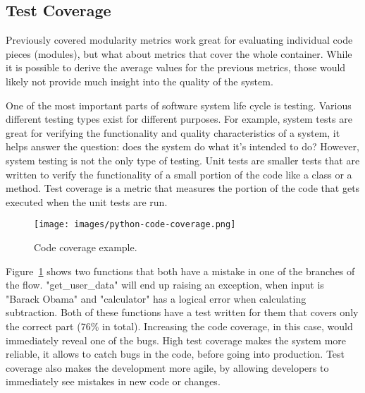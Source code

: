 \documentclass[12pt]{article}
\begin{document}
\subsection{Test Coverage}
Previously covered modularity metrics work great for evaluating individual code pieces (modules), but what about metrics that cover the whole container. While it is possible to derive the average values for the previous metrics, those would likely not provide much insight into the quality of the system. \par
One of the most important parts of software system life cycle is testing. Various different testing types exist for different purposes. For example, system tests are great for verifying the functionality and quality characteristics of a system, it helps answer the question: does the system do what it's intended to do? However, system testing is not the only type of testing. Unit tests are smaller tests that are written to verify the functionality of a small portion of the code like a class or a method. Test coverage is a metric that measures the portion of the code that gets executed when the unit tests are run.
\begin{figure}[H]
    \centering
    \texttt{[image: images/python-code-coverage.png]}
    \caption{Code coverage example.}
    \label{fig:python-code-coverage}
\end{figure}
Figure~\ref{fig:python-code-coverage} shows two functions that both have a mistake in one of the branches of the flow. "get\_user\_data" will end up raising an exception, when input is "Barack Obama" and "calculator" has a logical error when calculating subtraction. Both of these functions have a test written for them that covers only the correct part (76\% in total). Increasing the code coverage, in this case, would immediately reveal one of the bugs. High test coverage makes the system more reliable, it allows to catch bugs in the code, before going into production. Test coverage also makes the development more agile, by allowing developers to immediately see mistakes in new code or changes.
\end{document}
